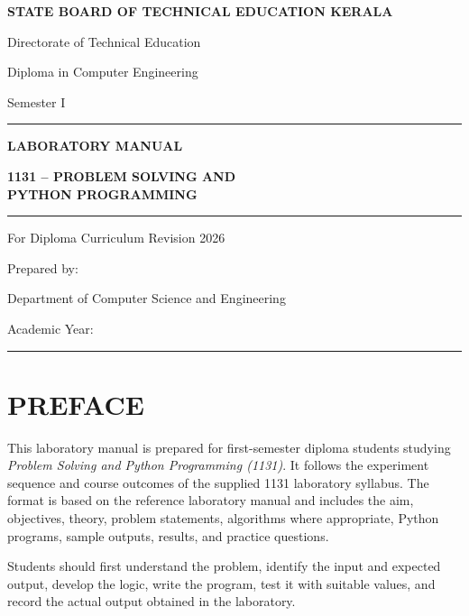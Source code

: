 \documentclass[12pt,a4paper]{report}
\begin{document}
\begin{titlepage}
\centering
\vspace*{1.2cm}
{\Large\bfseries STATE BOARD OF TECHNICAL EDUCATION KERALA\par}
\vspace{0.4cm}
{\large Directorate of Technical Education\par}
\vspace{1.4cm}
{\large Diploma in Computer Engineering\par}
{\large Semester I\par}
\vspace{1.3cm}
\rule{\textwidth}{1.2pt}\par
\vspace{0.5cm}
{\Huge\bfseries LABORATORY MANUAL\par}
\vspace{0.5cm}
{\Large\bfseries 1131 -- PROBLEM SOLVING AND\\[0.2cm] PYTHON PROGRAMMING\par}
\vspace{0.5cm}
\rule{\textwidth}{1.2pt}\par
\vspace{1cm}
{\large For Diploma Curriculum Revision 2026\par}
\vfill
{\large Prepared by:\par}
{\large Department of Computer Science and Engineering\par}
\vspace{0.3cm}
{\large Academic Year: \rule{4cm}{0.4pt}\par}
\vspace{1cm}
\end{titlepage}

\chapter*{PREFACE}
This laboratory manual is prepared for first-semester diploma students studying
\textit{Problem Solving and Python Programming (1131)}. It follows the experiment
sequence and course outcomes of the supplied 1131 laboratory syllabus. The format
is based on the reference laboratory manual and includes the aim, objectives,
theory, problem statements, algorithms where appropriate, Python programs,
sample outputs, results, and practice questions.

Students should first understand the problem, identify the input and expected output,
develop the logic, write the program, test it with suitable values, and record the
actual output obtained in the laboratory.
\end{document}
